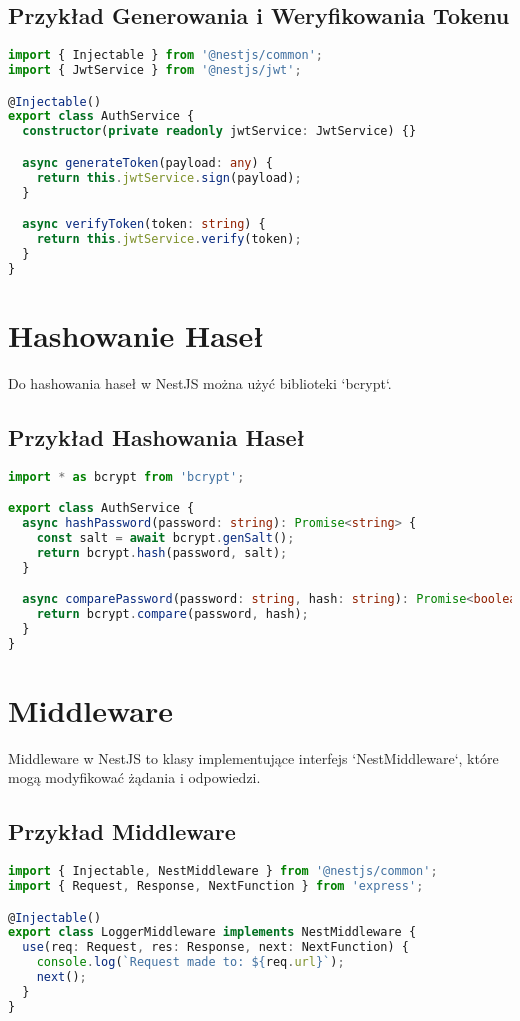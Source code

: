 \documentclass[a4paper,12pt]{article}
\begin{document}
\subsection{Przykład Generowania i Weryfikowania Tokenu}
\begin{lstlisting}[language=TypeScript, caption=Przykład użycia JWT w NestJS]
import { Injectable } from '@nestjs/common';
import { JwtService } from '@nestjs/jwt';

@Injectable()
export class AuthService {
  constructor(private readonly jwtService: JwtService) {}

  async generateToken(payload: any) {
    return this.jwtService.sign(payload);
  }

  async verifyToken(token: string) {
    return this.jwtService.verify(token);
  }
}
\end{lstlisting}

\section{Hashowanie Haseł}
Do hashowania haseł w NestJS można użyć biblioteki `bcrypt`.

\subsection{Przykład Hashowania Haseł}
\begin{lstlisting}[language=TypeScript, caption=Przykład hashowania haseł przy użyciu bcrypt]
import * as bcrypt from 'bcrypt';

export class AuthService {
  async hashPassword(password: string): Promise<string> {
    const salt = await bcrypt.genSalt();
    return bcrypt.hash(password, salt);
  }

  async comparePassword(password: string, hash: string): Promise<boolean> {
    return bcrypt.compare(password, hash);
  }
}
\end{lstlisting}

\section{Middleware}
Middleware w NestJS to klasy implementujące interfejs `NestMiddleware`, które mogą modyfikować żądania i odpowiedzi.

\subsection{Przykład Middleware}
\begin{lstlisting}[language=TypeScript, caption=Przykład middleware w NestJS]
import { Injectable, NestMiddleware } from '@nestjs/common';
import { Request, Response, NextFunction } from 'express';

@Injectable()
export class LoggerMiddleware implements NestMiddleware {
  use(req: Request, res: Response, next: NextFunction) {
    console.log(`Request made to: ${req.url}`);
    next();
  }
}
\end{lstlisting}
\end{document}
